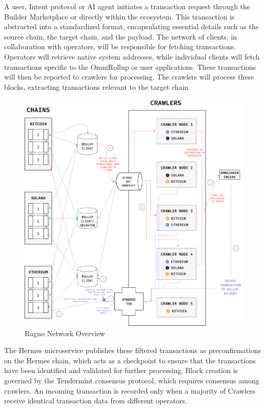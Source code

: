 A user, Intent protocol or AI agent initiates a transaction request through the Builder Marketplace or directly within the ecosystem. This transaction is abstracted into a standardized format, encapsulating essential details such as the source chain, the target chain, and the payload. The network of clients, in collaboration with operators, will be responsible for fetching transactions. Operators will retrieve native system addresses, while individual clients will fetch transactions specific to the OmniRollup or user applications. These transactions will then be reported to crawlers for processing. The crawlers will process these blocks, extracting transactions relevant to the target chain. 

\begin{figure}[h!]
    \centering
    \includegraphics[width=0.99\linewidth]{figure/ragno.png}
    \caption{Ragno Network Overview}
    \label{fig:ragno}
\end{figure}

The Hermes microservice publishes these filtered transactions as preconfirmations on the Hermes chain, which acts as a checkpoint to ensure that the transactions have been identified and validated for further processing. Block creation is governed by the Tendermint consensus protocol, which requires consensus among crawlers. An incoming transaction is recorded only when a majority of Crawlers receive identical transaction data from different operators.  

